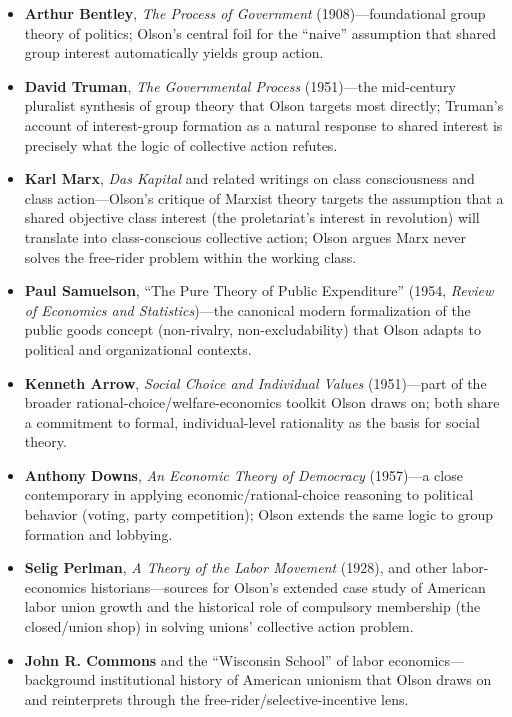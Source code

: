 \documentclass[12pt]{article}
\begin{document}
\begin{itemize}[leftmargin=*, itemsep=4pt]
    \item \textbf{Arthur Bentley}, \textit{The Process of Government} (1908)---foundational group theory of politics; Olson's central foil for the ``naive'' assumption that shared group interest automatically yields group action.
    \item \textbf{David Truman}, \textit{The Governmental Process} (1951)---the mid-century pluralist synthesis of group theory that Olson targets most directly; Truman's account of interest-group formation as a natural response to shared interest is precisely what the logic of collective action refutes.
    \item \textbf{Karl Marx}, \textit{Das Kapital} and related writings on class consciousness and class action---Olson's critique of Marxist theory targets the assumption that a shared objective class interest (the proletariat's interest in revolution) will translate into class-conscious collective action; Olson argues Marx never solves the free-rider problem within the working class.
    \item \textbf{Paul Samuelson}, ``The Pure Theory of Public Expenditure'' (1954, \textit{Review of Economics and Statistics})---the canonical modern formalization of the public goods concept (non-rivalry, non-excludability) that Olson adapts to political and organizational contexts.
    \item \textbf{Kenneth Arrow}, \textit{Social Choice and Individual Values} (1951)---part of the broader rational-choice/welfare-economics toolkit Olson draws on; both share a commitment to formal, individual-level rationality as the basis for social theory.
    \item \textbf{Anthony Downs}, \textit{An Economic Theory of Democracy} (1957)---a close contemporary in applying economic/rational-choice reasoning to political behavior (voting, party competition); Olson extends the same logic to group formation and lobbying.
    \item \textbf{Selig Perlman}, \textit{A Theory of the Labor Movement} (1928), and other labor-economics historians---sources for Olson's extended case study of American labor union growth and the historical role of compulsory membership (the closed/union shop) in solving unions' collective action problem.
    \item \textbf{John R. Commons} and the ``Wisconsin School'' of labor economics---background institutional history of American unionism that Olson draws on and reinterprets through the free-rider/selective-incentive lens.
\end{itemize}
\end{document}
